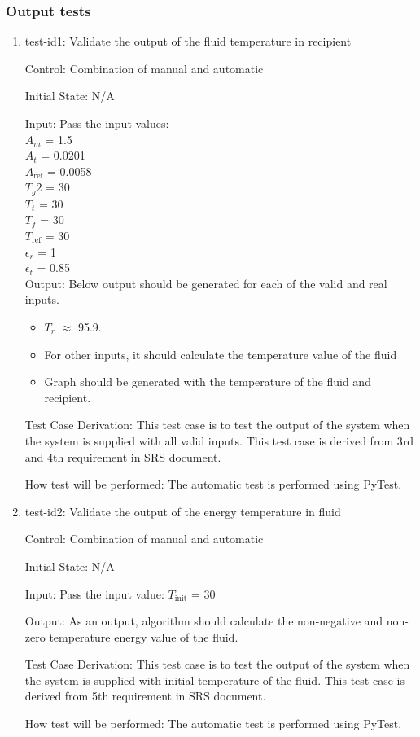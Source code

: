 \documentclass[12pt, titlepage]{article}
\begin{document}
\subsubsection{Output tests}
\label{output_functional_tests}
\begin{enumerate}

\item{test-id1: Validate the output of the fluid temperature in recipient  \\}

Control: Combination of manual and automatic 
					
Initial State: N/A
					
Input: Pass the input values: \\ 
       $A_m$ = 1.5 \\
       $A_t$ = 0.0201 \\
       $A_{\text{ref}}$ = 0.0058 \\
       $T_g2$ = 30 \\
       $T_t$ = 30 \\
       $T_f$ = 30 \\
       $T_\text{ref}$ = 30 \\ 
       $\epsilon_r$ = 1 \\
       $\epsilon_t$ = 0.85 \\
       
					
Output: Below output should be generated for each of the valid and real inputs. 
\begin{itemize}
    \item $T_r$ $\approx$ 95.9. 
    \item For other inputs, it should calculate the temperature value of the fluid 
    \item Graph should be generated with the temperature of the fluid and recipient.  
\end{itemize} 

Test Case Derivation: This test case is to test the output of the system when the system is supplied with all valid inputs. This test case is derived from 3rd and 4th requirement in SRS document.  
					
How test will be performed: The automatic test is performed using PyTest.  


\item{test-id2: Validate the output of the energy temperature in fluid  \\}

Control: Combination of manual and automatic 
					
Initial State: N/A
					
Input: Pass the input value: $T_\text{init}$ = 30 
					
Output: As an output, algorithm should calculate the non-negative and non-zero temperature energy value of the fluid.  

Test Case Derivation: This test case is to test the output of the system when the system is supplied with initial temperature of the fluid. This test case is derived from 5th requirement in SRS document.  
					
How test will be performed: The automatic test is performed using PyTest.  

\end{enumerate}   
\end{document}
